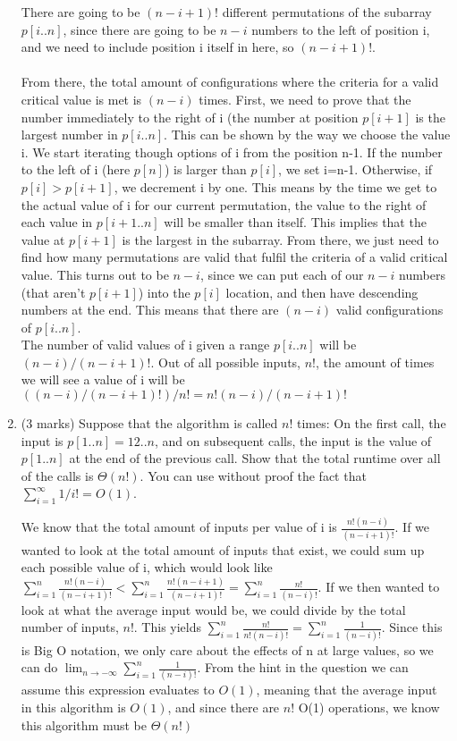 \documentclass[11pt]{article}
\begin{document}
\begin{enumerate}
\begin{soln}
There are going to be $(n-i+1)!$ different permutations of the subarray $p[i..n]$, since there are going to be $n-i$ numbers to the left of position i, and we need to include position i itself in here, so $(n-i+1)!$.\\ \\
From there, the total amount of configurations where the criteria for a valid critical value is met is $(n-i)$ times. First, we need to prove that the number immediately to the right of i (the number at position $p[i+1]$ is the largest number in $p[i..n]$. This can be shown by the way we choose the value i. We start iterating though options of i from the position n-1. If the number to the left of i (here $p[n]$) is larger than $p[i]$, we set i=n-1. Otherwise, if $p[i]>p[i+1]$, we decrement i by one. This means by the time we get to the actual value of i for our current permutation, the value to the right of each value in $p[i+1..n]$ will be smaller than itself. This implies that the value at $p[i+1]$ is the largest in the subarray. From there, we just need to find how many permutations are valid that fulfil the criteria of a valid critical value. This turns out to be $n-i$, since we can put each of our $n-i$ numbers (that aren't $p[i+1]$) into the $p[i]$ location, and then have descending numbers at the end. This means that there are $(n-i)$ valid configurations of $p[i..n]$.\\
The number of valid values of i given a range $p[i..n]$ will be $(n-i)/(n-i+1)!$. Out of all possible inputs, $n!$, the amount of times we will see a value of i will be $((n-i)/(n-i+1)!)/n! = n!(n-i)/(n-i+1)!$
\end{soln}

\item (3 marks)
Suppose that the algorithm is called $n!$ times: On the first call, the input is $p[1..n] = 12..n$, and on subsequent calls, the input is the value of $p[1..n]$ at the end of the previous call. Show that the total runtime over all of the calls is $\Theta(n!)$.
You can use without proof the fact that $\sum_{i=1}^{\infty} 1 / i! = O(1)$.
\\
\begin{soln}
We know that the total amount of inputs per value of i is $\frac{n!(n-i)}{(n-i+1)!}$. If we wanted to look at the total amount of inputs that exist, we could sum up each possible value of i, which would look like $\sum_{i=1}^{n} \frac{n!(n-i)}{(n-i+1)!} < \sum_{i=1}^{n} \frac{n!(n-i+1)}{(n-i+1)!} = \sum_{i=1}^{n} \frac{n!}{(n-i)!}$. If we then wanted to look at what the average input would be, we could divide by the total number of inputs, $n!$. This yields $\sum_{i=1}^{n} \frac{n!}{n!(n-i)!} = \sum_{i=1}^{n} \frac{1}{(n-i)!}$. Since this is Big O notation, we only care about the effects of n at large values, so we can do $\lim_{n \to -\infty} \sum_{i=1}^{n} \frac{1}{(n-i)!}$. From the hint in the question we can assume this expression evaluates to $O(1)$, meaning that the average input in this algorithm is $O(1)$, and since there are $n!$ O(1) operations, we know this algorithm must be $\Theta(n!)$
\end{soln}
\end{enumerate}
\end{document}
